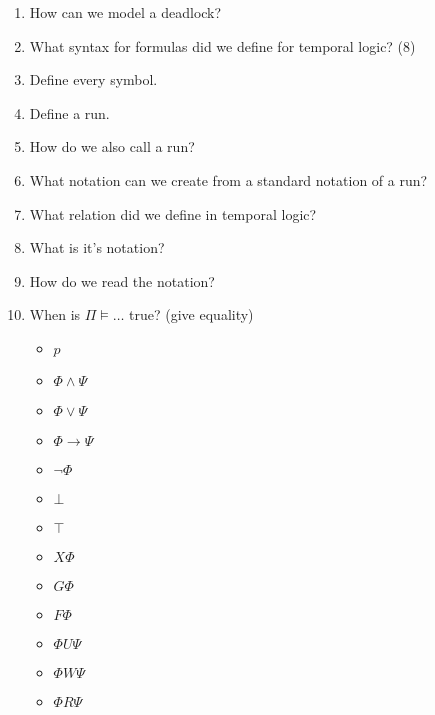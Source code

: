 \documentclass[fleqn]{article}
\begin{document}
\begin{enumerate}
\begin{itemize}
    \end{itemize}
    \item How can we model a deadlock?
    \item What syntax for formulas did we define for temporal logic? (8)
    \item Define every symbol.
    \item Define a run.
    \item How do we also call a run?
    \item What notation can we create from a standard notation of a run?
    \item What relation did we define in temporal logic?
    \item What is it's notation?
    \item How do we read the notation?
    \item When is $\Pi \models \dots$ true? (give equality)
    \begin{itemize}
        \item $p$
        \item $\Phi \wedge \Psi$
        \item $\Phi \vee \Psi$
        \item $\Phi \rightarrow \Psi$
        \item $\neg \Phi$
        \item $\bot$
        \item $\top$
        \item $X \Phi$
        \item $G \Phi$
        \item $F \Phi$
        \item $\Phi U \Psi$
        \item $\Phi W \Psi$
        \item $\Phi R \Psi$
    \end{itemize}
\end{enumerate}
\end{document}
